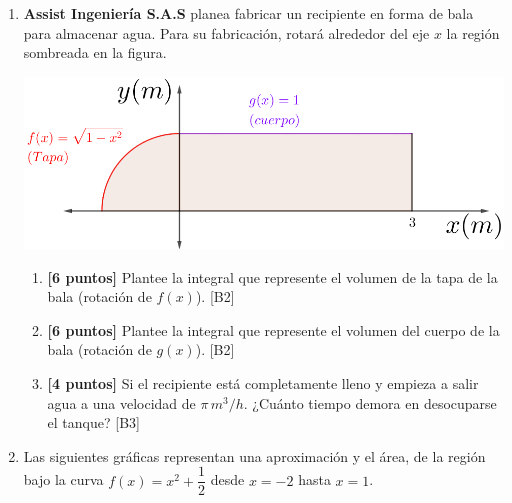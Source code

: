 \documentclass[10pt]{exam}
\begin{document}
\begin{enumerate}
\begin{enumerate}
\end{enumerate}

  
\item \textbf{Assist Ingeniería S.A.S} planea fabricar un recipiente en forma de bala para almacenar agua. Para su fabricación, rotará alrededor del eje $x$ la región sombreada en la figura.

\begin{center}
    \includegraphics[scale=1.5]{Depositobala2.png}
\end{center}

\begin{enumerate}
   \item \textbf{[6 puntos]} Plantee la integral que represente el volumen de la tapa de la bala (rotación de $f(x)$). \hfill{[B2]}

   \item \textbf{[6 puntos]} Plantee la integral que represente el volumen del cuerpo de la bala (rotación de $g(x)$). \hfill{[B2]}
    
   \item \textbf{[4 puntos]} Si el recipiente está completamente lleno y empieza a salir agua a una velocidad de $\pi\,m^3/h$.  ¿Cuánto tiempo demora en desocuparse el tanque?  \hfill{[B3]}
    
    
\end{enumerate}

\item Las siguientes gráficas representan una aproximación y el área, de la región bajo la curva $f(x)=x^2+\dfrac{1}{2}$ desde $x=-2$ hasta $x=1$.


\end{enumerate}
\end{document}

